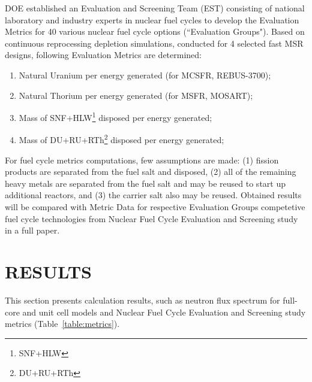 \documentclass{anstrans}
\begin{document}
DOE established an Evaluation and Screening Team (EST) consisting of national laboratory and industry experts in nuclear fuel cycles to develop the Evaluation Metrics for 40 various nuclear fuel cycle options (``Evaluation Groups"). Based on continuous reprocessing depletion simulations, conducted for 4 selected fast \gls{MSR} designs, following Evaluation Metrics are determined:
\vspace{-0.08in}
\begin{enumerate}
	\item Natural Uranium per energy generated (for \gls{MCSFR}, REBUS-3700);\vspace{-0.11in}
	\item Natural Thorium per energy generated (for \gls{MSFR}, \gls{MOSART});\vspace{-0.11in}
	\item Mass of SNF+HLW\footnote{\gls{SNF}+\gls{HLW}} disposed per energy generated;\vspace{-0.11in}
	\item Mass of DU+RU+RTh\footnote{\gls{DU}+\gls{RU}+\gls{RTh}} disposed per energy  generated;\vspace{-0.08in}
\end{enumerate}
For fuel cycle metrics computations, few assumptions are made: (1) fission products are separated from the fuel salt and disposed, (2) all of the remaining heavy metals are separated from the fuel salt and may be reused to start up additional reactors, and (3) the carrier salt also may be reused. Obtained results will be compared with Metric Data for respective Evaluation Groups competetive fuel cycle technologies from Nuclear Fuel Cycle Evaluation and Screening study \cite{wigeland_nuclear_2014} in a full paper.

\section{RESULTS} 
This section presents calculation results, such as neutron flux spectrum for full-core and unit cell models and Nuclear Fuel Cycle Evaluation and Screening study metrics (Table~\ref{table:metrics}).
\end{document}
